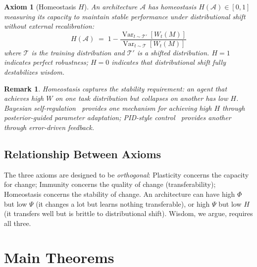 \documentclass{article}
\newtheorem{axiom}{Axiom}
\newtheorem{remark}{Remark}
\newcommand{\cA}{\mathcal{A}}
\newcommand{\cT}{\mathcal{T}}
\DeclareMathOperator{\Var}{Var}
\begin{document}
\begin{axiom}[Homeostasis $H$]
\label{ax:homeostasis}
An architecture $\cA$ has \emph{homeostasis} $H(\cA) \in [0, 1]$ measuring its capacity to maintain stable performance under distributional shift without external recalibration:
\begin{equation}
    H(\cA) \;=\; 1 - \frac{\Var_{t \sim \cT'}\!\left[W_t(M)\right]}{\Var_{t \sim \cT}\!\left[W_t(M)\right]}
\end{equation}
where $\cT$ is the training distribution and $\cT'$ is a shifted distribution.
$H = 1$ indicates perfect robustness; $H = 0$ indicates that distributional shift fully destabilizes wisdom.
\end{axiom}

\begin{remark}
Homeostasis captures the stability requirement: an agent that achieves high $W$ on one task distribution but collapses on another has low $H$.
Bayesian self-regulation~\citep{snoek2012practical} provides one mechanism for achieving high $H$ through posterior-guided parameter adaptation; PID-style control~\citep{astrom2006advanced} provides another through error-driven feedback.
\end{remark}

\subsection{Relationship Between Axioms}

The three axioms are designed to be \emph{orthogonal}: Plasticity concerns the capacity for change; Immunity concerns the quality of change (transferability); Homeostasis concerns the stability of change.
An architecture can have high $\Phi$ but low $\Psi$ (it changes a lot but learns nothing transferable), or high $\Psi$ but low $H$ (it transfers well but is brittle to distributional shift).
Wisdom, we argue, requires all three.

\section{Main Theorems}
\label{sec:theorems}
\end{document}
